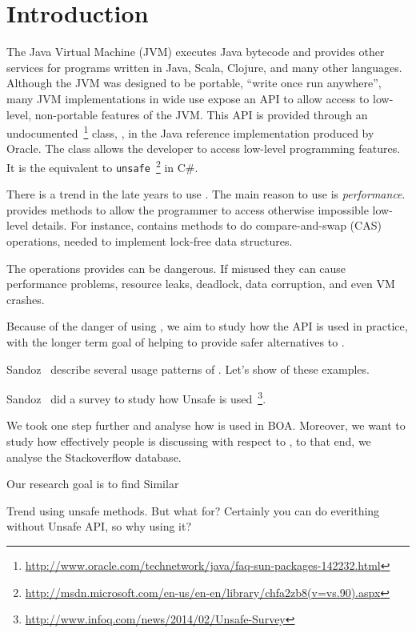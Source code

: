 
\section{Introduction} \label{sec:introduction}

The Java Virtual Machine (JVM) executes Java bytecode and provides other
services for programs written in Java, Scala, Clojure, and many other
languages. Although the JVM was designed to be portable, ``write once run
anywhere'', many JVM implementations in wide use expose an API to allow access
to low-level, non-portable features of the JVM.
This API is provided through an
undocumented~\footnote{\url{http://www.oracle.com/technetwork/java/faq-sun-packages-142232.html}}
class, \smu{}, in the Java reference implementation produced by Oracle.
The class allows the developer to access low-level programming features.
It is the equivalent to \texttt{unsafe}~\footnote{\url{http://msdn.microsoft.com/en-us/en-en/library/chfa2zb8(v=vs.90).aspx}} in C\#.

There is a trend in the late years to use \smu{}.
The main reason to use \smu{} is \emph{performance}.
\smu{} provides methods to allow the programmer to access otherwise impossible low-level details.
For instance, \smu{} contains methods to do compare-and-swap (CAS) operations,
needed to implement lock-free data structures.

The operations \smu{} provides can be dangerous. If misused they
can cause 
performance problems, resource leaks, deadlock, data corruption,
and even VM crashes. 

Because of the danger of using \smu{}, we aim to study how the API is used
in practice, with the longer term goal of helping to provide safer
alternatives
to \smu{}.

Sandoz~\cite{psandoz14} describe several usage patterns of \smu{}. Let's show of these examples.

Sandoz~\cite{psandoz14} did a survey to study how Unsafe is used~\footnote{\url{http://www.infoq.com/news/2014/02/Unsafe-Survey}}.

We took one step further and analyse how \smu{} is used in BOA. Moreover, we want to study how effectively people is discussing with respect to \smu{}, to that end, we analyse the Stackoverflow database.

Our research goal is to find 
Similar \cite{Dyer-Rajan-Nguyen-Nguyen-14}

Trend using unsafe methods. But what for? Certainly you can do everithing without Unsafe API, so why using it? 

